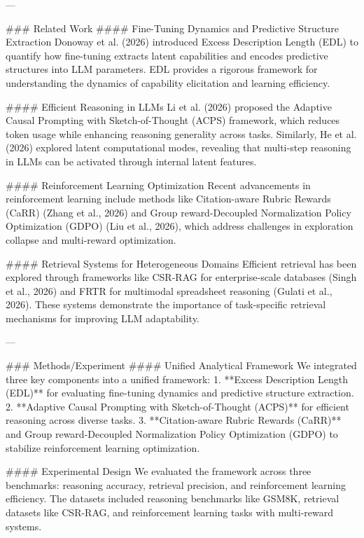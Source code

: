 ---

### Related Work  
#### Fine-Tuning Dynamics and Predictive Structure Extraction  
Donoway et al. (2026) introduced Excess Description Length (EDL) to quantify how fine-tuning extracts latent capabilities and encodes predictive structures into LLM parameters. EDL provides a rigorous framework for understanding the dynamics of capability elicitation and learning efficiency.  

#### Efficient Reasoning in LLMs  
Li et al. (2026) proposed the Adaptive Causal Prompting with Sketch-of-Thought (ACPS) framework, which reduces token usage while enhancing reasoning generality across tasks. Similarly, He et al. (2026) explored latent computational modes, revealing that multi-step reasoning in LLMs can be activated through internal latent features.  

#### Reinforcement Learning Optimization  
Recent advancements in reinforcement learning include methods like Citation-aware Rubric Rewards (CaRR) (Zhang et al., 2026) and Group reward-Decoupled Normalization Policy Optimization (GDPO) (Liu et al., 2026), which address challenges in exploration collapse and multi-reward optimization.  

#### Retrieval Systems for Heterogeneous Domains  
Efficient retrieval has been explored through frameworks like CSR-RAG for enterprise-scale databases (Singh et al., 2026) and FRTR for multimodal spreadsheet reasoning (Gulati et al., 2026). These systems demonstrate the importance of task-specific retrieval mechanisms for improving LLM adaptability.  

---

### Methods/Experiment  
#### Unified Analytical Framework  
We integrated three key components into a unified framework:  
1. **Excess Description Length (EDL)** for evaluating fine-tuning dynamics and predictive structure extraction.  
2. **Adaptive Causal Prompting with Sketch-of-Thought (ACPS)** for efficient reasoning across diverse tasks.  
3. **Citation-aware Rubric Rewards (CaRR)** and Group reward-Decoupled Normalization Policy Optimization (GDPO) to stabilize reinforcement learning optimization.  

#### Experimental Design  
We evaluated the framework across three benchmarks: reasoning accuracy, retrieval precision, and reinforcement learning efficiency. The datasets included reasoning benchmarks like GSM8K, retrieval datasets like CSR-RAG, and reinforcement learning tasks with multi-reward systems.  

